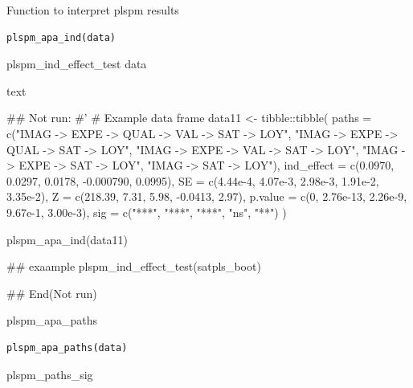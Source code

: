 \documentclass[a4paper]{book}
\begin{document}
%
\begin{Description}
Function to interpret plspm results
\end{Description}
%
\begin{Usage}
\begin{verbatim}
plspm_apa_ind(data)
\end{verbatim}
\end{Usage}
%
\begin{Arguments}
\begin{ldescription}
\item[\code{data}] plspm\_ind\_effect\_test data
\end{ldescription}
\end{Arguments}
%
\begin{Value}
text
\end{Value}
%
\begin{Examples}
\begin{ExampleCode}

\#\# Not run: 
#'
# Example data frame
data11 <- tibble::tibble(
  paths = c("IMAG -> EXPE -> QUAL -> VAL -> SAT -> LOY",
            "IMAG -> EXPE -> QUAL -> SAT -> LOY",
            "IMAG -> EXPE -> VAL -> SAT -> LOY",
            "IMAG -> EXPE -> SAT -> LOY",
            "IMAG -> SAT -> LOY"),
  ind_effect = c(0.0970, 0.0297, 0.0178, -0.000790, 0.0995),
  SE = c(4.44e-4, 4.07e-3, 2.98e-3, 1.91e-2, 3.35e-2),
  Z = c(218.39, 7.31, 5.98, -0.0413, 2.97),
  p.value = c(0, 2.76e-13, 2.26e-9, 9.67e-1, 3.00e-3),
  sig = c("***", "***", "***", "ns", "**")
)

plspm_apa_ind(data11)

## exaample
plspm_ind_effect_test(satpls_boot)%


## End(Not run)
\end{ExampleCode}
\end{Examples}
%
\begin{Description}
plspm\_apa\_paths
\end{Description}
%
\begin{Usage}
\begin{verbatim}
plspm_apa_paths(data)
\end{verbatim}
\end{Usage}
%
\begin{Arguments}
\begin{ldescription}
\item[\code{data}] plspm\_paths\_sig
\end{ldescription}
\end{Arguments}
\end{document}
